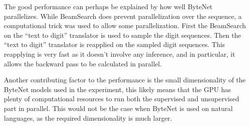 The good performance can perhaps be explained by how well ByteNet parallelizes. While BeamSearch does prevent parallelization over the sequence, a computational trick was used to allow some parallelization. First the BeamSearch on the ``text to digit'' translator is used to sample the digit sequences. Then the ``text to digit'' translator is reapplied on the sampled digit sequences. This reapplying is very fast as it doesn't involve any inference, and in particular, it allows the backward pass to be calculated in parallel.

Another contributing factor to the performance is the small dimensionality of the ByteNet models used in the experiment, this likely means that the GPU has plenty of computational resources to run both the supervised and unsupervised part in parallel. This would not be the case when ByteNet is used on natural languages, as the required dimensionality is much larger.